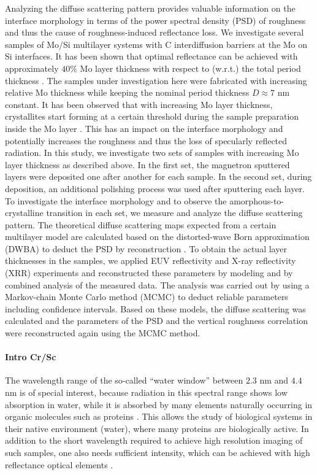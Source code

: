 Analyzing the diffuse scattering pattern provides valuable information on the interface morphology in terms of the power spectral density (PSD) of roughness and thus the cause of roughness-induced reflectance loss. We investigate several samples of Mo/Si multilayer systems with C interdiffusion barriers at the Mo on Si interfaces. It has been shown that optimal reflectance can be achieved with approximately $40 \%$ Mo layer thickness with respect to (w.r.t.) the total period thickness \cite{bajt_investigation_2001,braun_mo/si_2002}. The samples under investigation here were fabricated with increasing relative Mo thickness while keeping the nominal period thickness $D\approx 7$ nm constant. It has been observed that with increasing Mo layer thickness, crystallites start forming at a certain threshold during the sample preparation inside the Mo layer \cite{bajt_investigation_2001}. This has an impact on the interface morphology and potentially increases the roughness and thus the loss of specularly reflected radiation. In this study, we investigate two sets of samples with increasing Mo layer thickness as described above. In the first set, the magnetron sputtered layers were deposited one after another for each sample. In the second set, during deposition, an additional polishing process was used after sputtering each layer. To investigate the interface morphology and to observe the amorphous-to-crystalline transition in each set, we measure and analyze the diffuse scattering pattern. The theoretical diffuse scattering maps expected from a certain multilayer model are calculated based on the distorted-wave Born approximation (DWBA) to deduct the PSD by reconstruction \cite{holy_nonspecular_1994,holy_x-ray_1993,haase_role_2014}. To obtain the actual layer thicknesses in the samples, we applied EUV reflectivity and X-ray reflectivity (XRR) experiments and reconstructed these parameters by modeling and by combined analysis of the measured data. The analysis was carried out by using a Markov-chain Monte Carlo method (MCMC) \cite{foreman-mackey_emcee:_2013} to deduct reliable parameters including confidence intervals. Based on these models, the diffuse scattering was calculated and the parameters of the PSD and the vertical roughness correlation were reconstructed again using the MCMC method.

\paragraph{Intro Cr/Sc}
The wavelength range of the so-called ``water window'' between $2.3$ nm and 
$4.4$ nm is of special interest, because radiation in this spectral range shows 
low absorption in water, while it is absorbed by many elements naturally 
occurring in organic molecules such as proteins \cite{kirz_soft_1995}. 
This allows the study of biological systems in their native environment 
(water), where many proteins are biologically active. In addition to the short 
wavelength required to achieve high resolution imaging of such samples, one 
also needs sufficient intensity, which can be achieved with high reflectance 
optical elements \cite{hertz_normal-incidence_1999,legall_compact_2012}.

